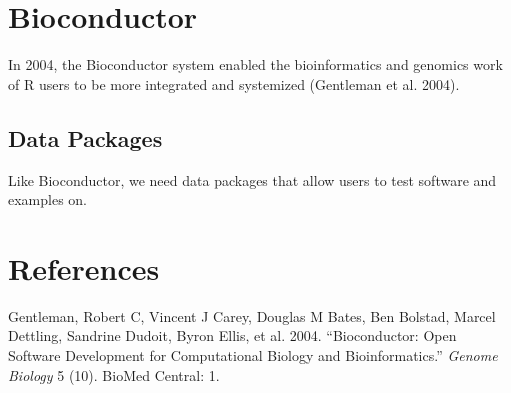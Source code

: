 \documentclass[]{elsarticle} %
\begin{document}
\section{Bioconductor}\label{bioconductor}

In 2004, the Bioconductor system enabled the bioinformatics and genomics
work of R users to be more integrated and systemized (Gentleman et al.
2004).

\subsection{Data Packages}\label{data-packages}

Like Bioconductor, we need data packages that allow users to test
software and examples on.

\section*{References}\label{references}

\hypertarget{refs}{}
\hypertarget{ref-gentleman2004bioconductor}{}
Gentleman, Robert C, Vincent J Carey, Douglas M Bates, Ben Bolstad,
Marcel Dettling, Sandrine Dudoit, Byron Ellis, et al. 2004.
``Bioconductor: Open Software Development for Computational Biology and
Bioinformatics.'' \emph{Genome Biology} 5 (10). BioMed Central: 1.
\end{document}
